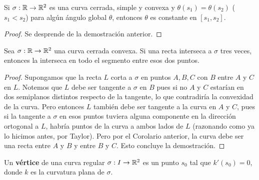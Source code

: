 \begin{cor}
Si $\sigma:\mathbb{R}\to\mathbb{R}^2$ es una curva cerrada, simple y convexa y $\theta(s_1)=\theta(s_2)$ ($s_1<s_2$) para algún ángulo global $\theta$, entonces $\theta$ es constante en $[s_1,s_2]$.
\begin{proof}
Se desprende de la demostración anterior.
\end{proof}
\end{cor}

\begin{cor}\label{cor::intconvrecta}
Sea $\sigma:\mathbb{R}\to\mathbb{R}^2$ una curva cerrada convexa. Si una recta interseca a $\sigma$ tres veces, entonces la interseca en todo el segmento entre esos dos puntos.
\begin{proof}
Supongamos que la recta $L$ corta a $\sigma$ en puntos $A,B,C$ con $B$ entre $A$ y $C$ en $L$. Notemos que $L$ debe ser tangente a $\sigma$ en $B$ pues si no $A$ y $C$ estarían en dos semiplanos distintos respecto de la tangente, lo que contradiría la convexidad de la curva. Pero entonces $L$ también debe ser tangente a la curva en $A$ y $C$, pues si la tangente a $\sigma$ en esos puntos tuviera alguna componente en la dirección ortogonal a $L$, habría puntos de la curva a ambos lados de $L$ (razonando como ya lo hicimos antes, por Taylor). Pero por el Corolario anterior, la curva debe ser una recta entre $A$ y $B$ y entre $B$ y $C$. Esto concluye la demostración.
\end{proof}
\end{cor}

\begin{defn}
Un \textbf{vértice} de una curva regular $\sigma:I\to\mathbb{R}^2$ es un punto $s_0$ tal que $k'(s_0)=0$, donde $k$ es la curvatura plana de $\sigma$.
\end{defn}

